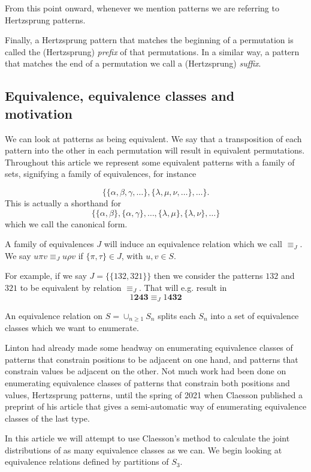 \documentclass[a4paper, 11pt, english]{article}
\theoremstyle{definition}
\newcommand{\Sym}{S}
\begin{document}
From this point onward, whenever we mention patterns we are referring to
Hertzsprung patterns.

Finally, a Hertzsprung pattern that matches the beginning of a permutation is
called the (Hertzsprung) \emph{prefix} of that permutations. In a similar way, a pattern
that matches the end of a permutation we call a (Hertzsprung) \emph{suffix}.


\subsection{Equivalence, equivalence classes and motivation}
We can look at patterns as being equivalent. We say that a transposition of each pattern into
the other in each permutation will result in equivalent permutations. Throughout
this article we represent some equivalent patterns with a family of sets, signifying
a family of equivalences, for instance

\[
    \{ \{\alpha, \beta, \gamma, \dots \}, \{\lambda, \mu, \nu, \dots \}, \dots
    \}.
\]
This is actually a shorthand for
\[
    \{ \{ \alpha, \beta \}, \{ \alpha, \gamma \}, \dots, \{ \lambda, \mu \}, \{
        \lambda, \nu \}, \dots \}
\]
which we call the canonical form.

A family of equivalences $J$ will induce an equivalence relation which we call $\equiv_J$. We
say $u \pi v \equiv_J u \rho v$ if $\{ \pi, \tau \} \in J$, with $u,v \in \Sym$.

For example, if we say $J = \{ \{ 132, 321 \} \}$ then we consider the patterns $132$ and $321$ to
be equivalent by relation $\equiv_J$. That will e.g. result in
\[
    1\bm{243} \equiv_J 1\bm{432}
\]

An equivalence relation on $\Sym = \cup_{n \geq 1} \Sym_n$ splits each $\Sym_n$
into a set of equivalence classes which we want to enumerate. 

Linton had already made some headway on enumerating equivalence classes of patterns that constrain
positions to be adjacent on one hand, and patterns that constrain values be adjacent on the other.
Not much work had been done on enumerating equivalence classes of patterns that constrain both
positions and values, Hertzsprung patterns, until the spring of 2021 when Claesson published a
preprint of his article that gives a semi-automatic way of enumerating equivalence classes of the
last type.

In this article we will attempt to use Claesson's method to calculate the joint distributions of as
many equivalence classes as we can. We begin looking at equivalence relations defined by partitions
of $\Sym_3$.
\end{document}
